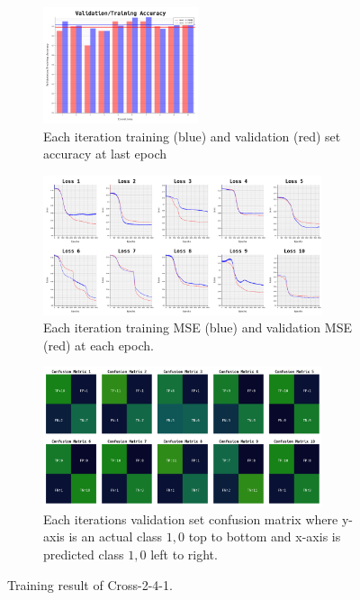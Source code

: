 \documentclass{article}
\begin{document}
\begin{figure}[ht]
	\begin{subfigure}{\textwidth}
		\centering
		\includegraphics[width=0.5\textwidth]{cross-2-4-1/acc}
		\caption{Each iteration training (blue) and validation (red) set accuracy at last epoch}
		\label{fig:7a}
	\end{subfigure}
	\begin{subfigure}{\textwidth}
		\centering
		\includegraphics[width=0.9\textwidth]{cross-2-4-1/loss}
		\caption{Each iteration training MSE (blue) and validation MSE (red) at each epoch.}
		\label{fig:7b}
	\end{subfigure}
	\begin{subfigure}{\textwidth}
		\centering
		\includegraphics[width=0.9\textwidth]{cross-2-4-1/confusion_matrix}
		\caption{Each iterations validation set confusion matrix where y-axis is an actual class $1, 0$ top to bottom and x-axis is predicted class $1, 0$ left to right.}
		\label{fig:7c}
	\end{subfigure}
	\caption{Training result of Cross-2-4-1.}
	\label{fig:7}
\end{figure}
\FloatBarrier
\end{document}
